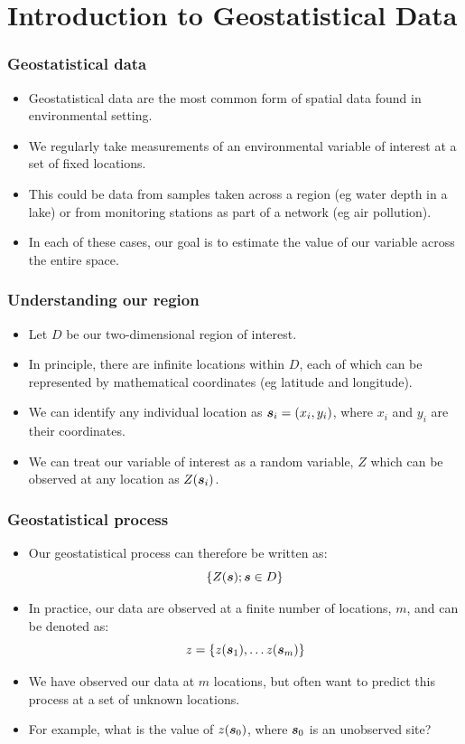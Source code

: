 \documentclass[parskip,12pt]{beamer}
\newcommand{\bd}[1]{\ensuremath{\mbox{\boldmath $#1$}}}
\begin{document}
\section{Introduction to Geostatistical Data}

\begin{frame}
\frametitle{Geostatistical data}
 \begin{itemize}
\item Geostatistical data are the most common form of spatial data found in environmental setting.
\vspace{3mm}
\item We regularly take measurements of an environmental variable of interest at a set of fixed locations.
\vspace{3mm}
\item This could be data from samples taken across a region (eg water depth in a lake) or from monitoring stations as part of a network (eg air pollution).
\vspace{3mm}
\item In each of these cases, our goal is to estimate the value of our variable across the entire space.
\end{itemize}
\end{frame}


\begin{frame}
\frametitle{Understanding our region}
 \begin{itemize}
\item Let $D$ be our two-dimensional region of interest.
\vspace{3mm}
\item In principle, there are infinite locations within $D$, each of which can be represented by mathematical coordinates (eg latitude and longitude).
\vspace{3mm}
\item We can identify any individual location as $\bd{s}_i = (x_i, y_i)$, where $x_i$ and $y_i$ are their coordinates.
\vspace{3mm}
\item We can treat our variable of interest as a random variable, $Z$ which can be observed at any location as $Z(\bd{s}_i)$.
\end{itemize}
\end{frame}


\begin{frame}
\frametitle{Geostatistical process}
 \begin{itemize}
\item Our geostatistical process can therefore be written as: $$\{Z(\bd{s}); \bd{s} \in D\}$$
\item In practice, our data are observed at a finite number of locations, $m$, and can be denoted as: $$z = \{z(\bd{s}_1), \ldots z(\bd{s}_m) \}$$
\item We have observed our data at $m$ locations, but often want to predict this process at a set of unknown locations.
\vspace{3mm}
\item For example, what is the value of $z(\bd{s}_0)$, where $\bd{s}_0$ is an unobserved site?
\end{itemize}
\end{frame}
\end{document}
